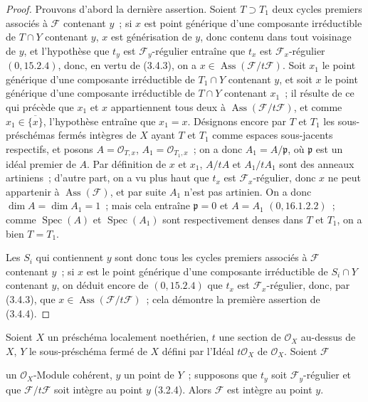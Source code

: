 \begin{proof}
Prouvons d'abord la dernière assertion. Soient $T\supset T_1$ deux cycles
premiers associés à $\mathcal F$ contenant $y$~; si $x$ est point générique
d'une composante irréductible de $T\cap Y$ contenant $y$, $x$ est
générisation de $y$, donc contenu dans tout voisinage de $y$, et l'hypothèse
que $t_y$ est $\mathcal F_y$-régulier entraîne que $t_x$ est
$\mathcal F_x$-régulier $(0,15.2.4)$, donc, en vertu de (3.4.3), on a
$x\in\operatorname{Ass}(\mathcal F/t\mathcal F)$. Soit $x_1$ le point
générique d'une composante irréductible de $T_1\cap Y$ contenant $y$, et soit
$x$ le point générique d'une composante irréductible de $T\cap Y$ contenant
$x_1$~; il résulte de ce qui précède que $x_1$ et $x$ appartiennent tous deux
à $\operatorname{Ass}(\mathcal F/t\mathcal F)$, et comme
$x_1\in\overline{\{x\}}$, l'hypothèse entraîne que $x_1=x$. Désignons encore
par $T$ et $T_1$ les sous-préschémas fermés intègres de $X$ ayant $T$ et
$T_1$ comme espaces sous-jacents respectifs, et posons
$A=\mathcal O_{T,x}$, $A_1=\mathcal O_{T_1,x}$~; on a donc
$A_1=A/\mathfrak p$, où $\mathfrak p$ est un idéal premier de $A$. Par
définition de $x$ et $x_1$, $A/tA$ et $A_1/tA_1$ sont des anneaux artiniens~;
d'autre part, on a vu plus haut que $t_x$ est $\mathcal F_x$-régulier, donc
$x$ ne peut appartenir à $\operatorname{Ass}(\mathcal F)$, et par suite $A_1$
n'est pas artinien. On a donc $\dim A=\dim A_1=1$~; mais cela entraîne
$\mathfrak p=0$ et $A=A_1$ $(0,16.1.2.2)$~; comme
$\operatorname{Spec}(A)$ et $\operatorname{Spec}(A_1)$ sont respectivement
denses dans $T$ et $T_1$, on a bien $T=T_1$.

Les $S_i$ qui contiennent $y$ sont donc tous les cycles premiers associés à
$\mathcal F$ contenant $y$~; si $x$ est le point générique d'une composante
irréductible de $S_i\cap Y$ contenant $y$, on déduit encore de $(0,15.2.4)$
que $t_x$ est $\mathcal F_x$-régulier, donc, par (3.4.3), que
$x\in\operatorname{Ass}(\mathcal F/t\mathcal F)$~; cela démontre la première
assertion de (3.4.4).
\end{proof}

\begin{proposition}[3.4.5]
\label{IV.2.3.4.5-fr}
Soient $X$ un préschéma localement noethérien, $t$ une section de
$\mathcal O_X$ au-dessus de $X$, $Y$ le sous-préschéma fermé de $X$ défini par
l'Idéal $t\mathcal O_X$ de $\mathcal O_X$. Soient $\mathcal F$


un $\mathcal O_X$-Module cohérent, $y$ un point de $Y$~; supposons que $t_y$
soit $\mathcal F_y$-régulier et que $\mathcal F/t\mathcal F$ soit intègre au
point $y$ (3.2.4). Alors $\mathcal F$ est intègre au point $y$.
\end{proposition}

